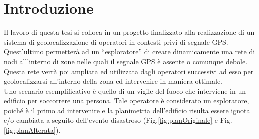 \chapter*{Introduzione}
\thispagestyle{empty}

Il lavoro di questa tesi si colloca in un progetto finalizzato alla realizzazione di un sistema di geolocalizzazione di operatori in contesti privi di segnale GPS.
Quest'ultimo permetterà ad un “esploratore” di creare dinamicamente una rete di nodi all’interno di zone nelle quali il segnale GPS è assente o comunque debole. Questa rete verrà poi ampliata ed utilizzata dagli operatori successivi ad esso per geolocalizzarsi all’interno della zona ed intervenire in maniera ottimale. \\
Uno scenario esemplificativo è quello di un vigile del fuoco che interviene in un edificio per soccorrere una persona. Tale operatore è considerato un esploratore, poiché è il primo ad intervenire e la planimetria dell’edificio risulta essere ignota e/o cambiata a seguito dell’evento disastroso (Fig.\ref{fig:planOriginale} e Fig.\ref{fig:planAlterata}). 

